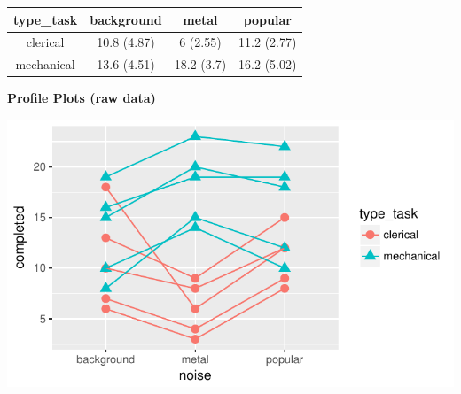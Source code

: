 \documentclass[]{article}
\begin{document}
\begin{longtable}[]{@{}cccc@{}}
\toprule
\begin{minipage}[b]{0.16\columnwidth}\centering\strut
type\_task\strut
\end{minipage} & \begin{minipage}[b]{0.17\columnwidth}\centering\strut
background\strut
\end{minipage} & \begin{minipage}[b]{0.16\columnwidth}\centering\strut
metal\strut
\end{minipage} & \begin{minipage}[b]{0.16\columnwidth}\centering\strut
popular\strut
\end{minipage}\tabularnewline
\midrule
\endhead
\begin{minipage}[t]{0.16\columnwidth}\centering\strut
clerical\strut
\end{minipage} & \begin{minipage}[t]{0.17\columnwidth}\centering\strut
10.8 (4.87)\strut
\end{minipage} & \begin{minipage}[t]{0.16\columnwidth}\centering\strut
6 (2.55)\strut
\end{minipage} & \begin{minipage}[t]{0.16\columnwidth}\centering\strut
11.2 (2.77)\strut
\end{minipage}\tabularnewline
\begin{minipage}[t]{0.16\columnwidth}\centering\strut
mechanical\strut
\end{minipage} & \begin{minipage}[t]{0.17\columnwidth}\centering\strut
13.6 (4.51)\strut
\end{minipage} & \begin{minipage}[t]{0.16\columnwidth}\centering\strut
18.2 (3.7)\strut
\end{minipage} & \begin{minipage}[t]{0.16\columnwidth}\centering\strut
16.2 (5.02)\strut
\end{minipage}\tabularnewline
\bottomrule
\end{longtable}

\textbf{Profile Plots (raw data)}

\begin{center}\includegraphics{Unit_5_assignment_KEY_R__spr18__files/figure-latex/unnamed-chunk-52-1} \end{center}
\end{document}
